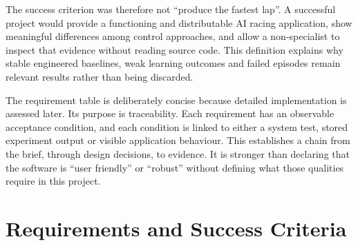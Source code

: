 The success criterion was therefore not \enquote{produce the fastest lap}. A successful project would provide a functioning and distributable AI racing application, show meaningful differences among control approaches, and allow a non-specialist to inspect that evidence without reading source code. This definition explains why stable engineered baselines, weak learning outcomes and failed episodes remain relevant results rather than being discarded.

The requirement table is deliberately concise because detailed implementation is assessed later. Its purpose is traceability. Each requirement has an observable acceptance condition, and each condition is linked to either a system test, stored experiment output or visible application behaviour. This establishes a chain from the brief, through design decisions, to evidence. It is stronger than declaring that the software is \enquote{user friendly} or \enquote{robust} without defining what those qualities require in this project.

\section{Requirements and Success Criteria}
\label{ch:requirements}

